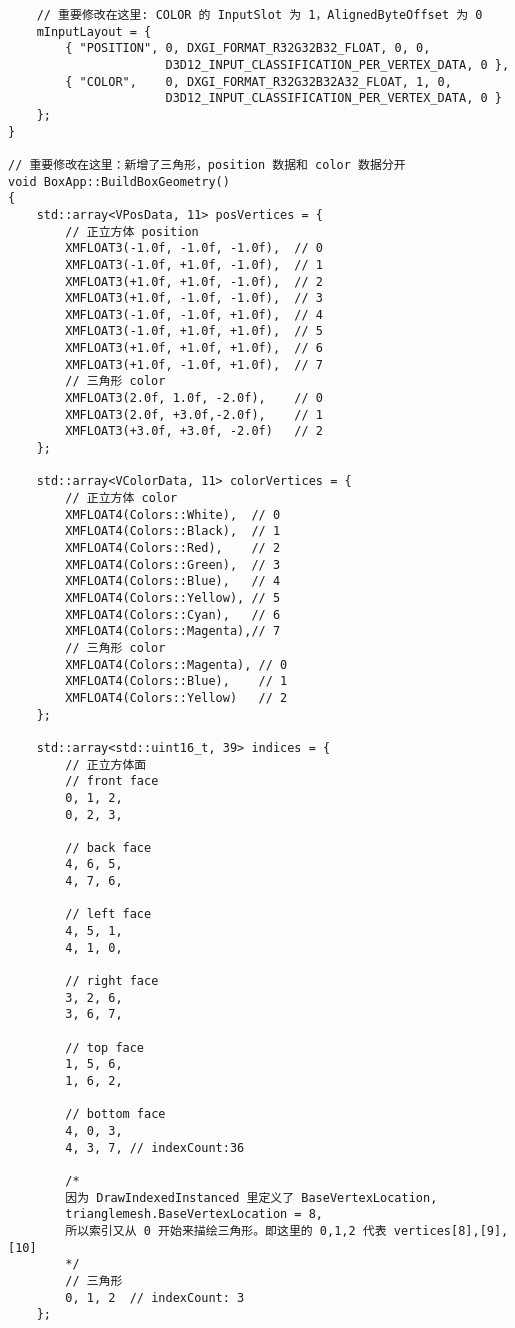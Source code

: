 \begin{lstlisting}
    // 重要修改在这里: COLOR 的 InputSlot 为 1，AlignedByteOffset 为 0
    mInputLayout = {
        { "POSITION", 0, DXGI_FORMAT_R32G32B32_FLOAT, 0, 0, 
                      D3D12_INPUT_CLASSIFICATION_PER_VERTEX_DATA, 0 },
        { "COLOR",    0, DXGI_FORMAT_R32G32B32A32_FLOAT, 1, 0, 
                      D3D12_INPUT_CLASSIFICATION_PER_VERTEX_DATA, 0 }
    };
}

// 重要修改在这里：新增了三角形，position 数据和 color 数据分开
void BoxApp::BuildBoxGeometry()
{
    std::array<VPosData, 11> posVertices = {
        // 正立方体 position
        XMFLOAT3(-1.0f, -1.0f, -1.0f),  // 0
        XMFLOAT3(-1.0f, +1.0f, -1.0f),  // 1
        XMFLOAT3(+1.0f, +1.0f, -1.0f),  // 2
        XMFLOAT3(+1.0f, -1.0f, -1.0f),  // 3
        XMFLOAT3(-1.0f, -1.0f, +1.0f),  // 4
        XMFLOAT3(-1.0f, +1.0f, +1.0f),  // 5
        XMFLOAT3(+1.0f, +1.0f, +1.0f),  // 6
        XMFLOAT3(+1.0f, -1.0f, +1.0f),  // 7
        // 三角形 color
        XMFLOAT3(2.0f, 1.0f, -2.0f),    // 0
        XMFLOAT3(2.0f, +3.0f,-2.0f),    // 1
        XMFLOAT3(+3.0f, +3.0f, -2.0f)   // 2
    };

    std::array<VColorData, 11> colorVertices = {
        // 正立方体 color
        XMFLOAT4(Colors::White),  // 0
        XMFLOAT4(Colors::Black),  // 1
        XMFLOAT4(Colors::Red),    // 2
        XMFLOAT4(Colors::Green),  // 3
        XMFLOAT4(Colors::Blue),   // 4
        XMFLOAT4(Colors::Yellow), // 5
        XMFLOAT4(Colors::Cyan),   // 6
        XMFLOAT4(Colors::Magenta),// 7
        // 三角形 color
        XMFLOAT4(Colors::Magenta), // 0
        XMFLOAT4(Colors::Blue),    // 1
        XMFLOAT4(Colors::Yellow)   // 2
    };

    std::array<std::uint16_t, 39> indices = {
        // 正立方体面
        // front face
        0, 1, 2,
        0, 2, 3,

        // back face
        4, 6, 5,
        4, 7, 6,

        // left face
        4, 5, 1,
        4, 1, 0,

        // right face
        3, 2, 6,
        3, 6, 7,

        // top face
        1, 5, 6,
        1, 6, 2,

        // bottom face
        4, 0, 3,
        4, 3, 7, // indexCount:36

        /*
        因为 DrawIndexedInstanced 里定义了 BaseVertexLocation,
        trianglemesh.BaseVertexLocation = 8,
        所以索引又从 0 开始来描绘三角形。即这里的 0,1,2 代表 vertices[8],[9],[10]
        */
        // 三角形
        0, 1, 2  // indexCount: 3
    };


\end{lstlisting}
